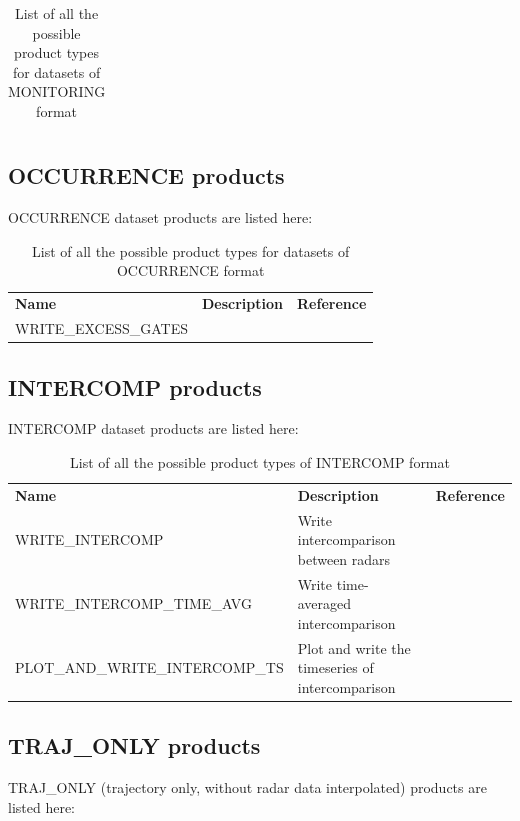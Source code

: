 \documentclass[a4paper,11pt,pdftex,twoside]{scrartcl}
\renewcommand{\bf}{\normalfont \bfseries}
\begin{document}
{{{\begin{table}[H]
\begin{tabularx}{\textwidth}{lXl}
\end{tabularx}
\caption{List of all the possible product types for datasets of MONITORING format}
\label{tab_products_MONITORING}
\end{table}

\subsection{OCCURRENCE products}
OCCURRENCE dataset products are listed here:

\begin{table}[H]
\begin{tabularx}{\textwidth}{lXl}
{\bf Name} & {\bf Description} & {\bf Reference}\\
 WRITE\_EXCESS\_GATES &  &  \\
\end{tabularx}
\caption{List of all the possible product types for datasets of OCCURRENCE format}
\label{tab_products_OCCURRENCE}
\end{table}

\subsection{INTERCOMP products}
INTERCOMP dataset products are listed here:

\begin{table}[H]
\begin{tabularx}{\textwidth}{lXl}
{\bf Name} & {\bf Description} & {\bf Reference}\\
 WRITE\_INTERCOMP & Write intercomparison between radars &  \\
 WRITE\_INTERCOMP\_TIME\_AVG & Write time-averaged intercomparison  &  \\
 PLOT\_AND\_WRITE\_INTERCOMP\_TS & Plot and write the timeseries of intercomparison & \\

\end{tabularx}
\caption{List of all the possible product types of INTERCOMP format}
\label{tab_products_INTERCOMP}
\end{table}

\subsection{TRAJ\_ONLY products}
TRAJ\_ONLY (trajectory only, without radar data interpolated) products are listed here:

}}}
\end{document}
